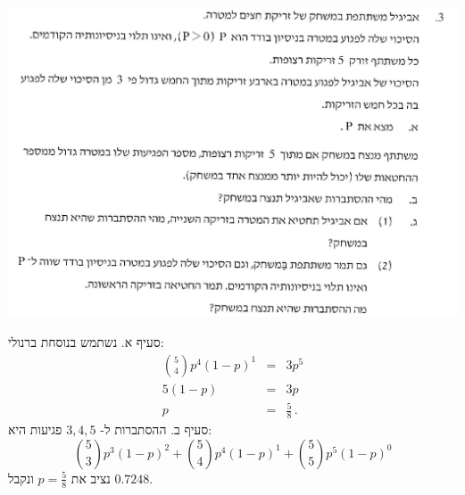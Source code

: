 \documentclass[12pt,a4paper]{article}
\begin{document}
%
%



\textbf{}

\begin{center}
\includegraphics[width=.95\textwidth]{winter-2017-3.png}
\end{center}
\vspace{-1ex}

סעיף א. נשתמש בנוסחת ברנולי:
\begin{eqnarray*}
{5 \choose 4} p^4(1-p)^1 &=& 3p^5\\
5 (1-p) &=& 3p\\
p&=&\frac{5}{8}\,.
\end{eqnarray*}
סעיף ב. ההסתברות ל-%
$3,4,5$
פגיעות היא:
\[
{5 \choose 3}p^3(1-p)^2 + {5 \choose 4}p^4(1-p)^1 + {5 \choose 5}p^5(1-p)^0
\]
נציב את
$p=\frac{5}{8}$
ונקבל
$0.7248$.
\end{document}
